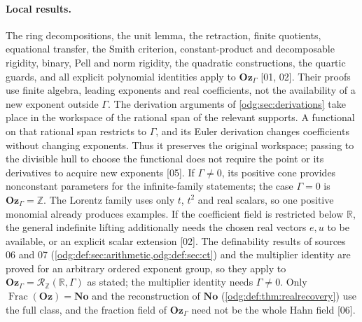 \documentclass[11pt,oneside]{article}
\numberwithin{equation}{section}
\theoremstyle{definition}
\theoremstyle{remark}
\newcommand{\No}{\mathbf{No}}
\newcommand{\Oz}{\mathbf{Oz}}
\newcommand{\Z}{\mathbb Z}
\newcommand{\R}{\mathbb R}
\newcommand{\Frac}{\operatorname{Frac}}
\newcommand{\src}[1]{\textup{\textsf{\small[#1]}}}
\begin{document}
\paragraph{Local results.} The ring decompositions, the unit lemma, the
retraction, finite quotients, equational transfer, the Smith criterion,
constant-product and decomposable rigidity, binary, Pell and norm rigidity,
the quadratic constructions, the quartic guards, and all explicit
polynomial identities apply to $\Oz_\Gamma$ \src{01, 02}. Their proofs use finite algebra,
leading exponents and real coefficients, not the availability of a new
exponent outside $\Gamma$. The derivation arguments of
\cref{odg:sec:derivations} take place in the workspace of the rational span of
the relevant supports. A functional on that rational span restricts to
$\Gamma$, and its Euler derivation changes coefficients without changing
exponents. Thus it preserves the original workspace; passing to the
divisible hull to choose the functional does not require the point or its
derivatives to acquire new exponents \src{05}. If $\Gamma\ne0$, its positive cone
provides nonconstant parameters for the infinite-family statements; the case
$\Gamma=0$ is $\Oz_\Gamma=\Z$. The Lorentz family uses only $t$, $t^2$ and
real scalars, so one positive monomial already produces examples. If the
coefficient field is restricted below $\R$, the general indefinite lifting
additionally needs the chosen real vectors $e,u$ to be available, or an
explicit scalar extension \src{02}. The definability results of sources 06
and 07 (\cref{odg:def:sec:arithmetic,odg:def:sec:ct}) and the multiplier
identity are proved for an arbitrary ordered exponent group, so they apply to
$\Oz_\Gamma=\mathcal R_\Z(\R,\Gamma)$ as stated; the multiplier identity needs
$\Gamma\ne0$. Only $\Frac(\Oz)=\No$ and the reconstruction of $\No$
(\cref{odg:def:thm:realrecovery}) use the full class, and the fraction field
of $\Oz_\Gamma$ need not be the whole Hahn field \src{06}.
\end{document}
